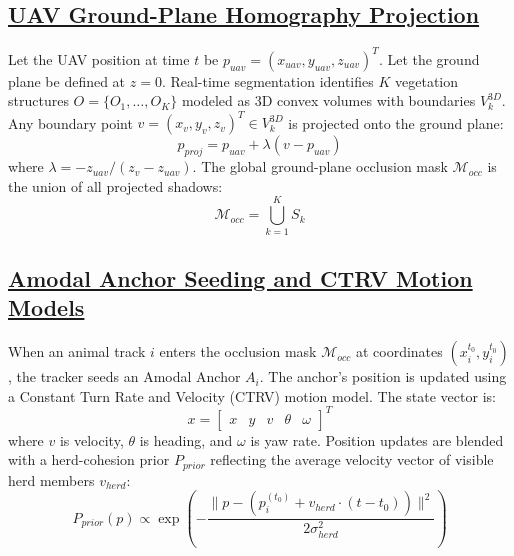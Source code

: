\documentclass[12pt]{article}
\begin{document}
\subsection*{\underline{\textbf{UAV Ground-Plane Homography Projection}}}
Let the UAV position at time $t$ be $p_{uav} = (x_{uav}, y_{uav}, z_{uav})^T$. Let the ground plane be defined at $z=0$. Real-time segmentation identifies $K$ vegetation structures $O = \{O_1, \dots, O_K\}$ modeled as 3D convex volumes with boundaries $V_k^{3D}$. Any boundary point $v = (x_v, y_v, z_v)^T \in V_k^{3D}$ is projected onto the ground plane:
\begin{equation}
p_{proj} = p_{uav} + \lambda (v - p_{uav})
\end{equation}
where $\lambda = -z_{uav} / (z_v - z_{uav})$. The global ground-plane occlusion mask $\mathcal{M}_{occ}$ is the union of all projected shadows:
\begin{equation}
\mathcal{M}_{occ} = \bigcup_{k=1}^K S_k
\end{equation}

\subsection*{\underline{\textbf{Amodal Anchor Seeding and CTRV Motion Models}}}
When an animal track $i$ enters the occlusion mask $\mathcal{M}_{occ}$ at coordinates $(x_i^{t_0}, y_i^{t_0})$, the tracker seeds an Amodal Anchor $A_i$. The anchor's position is updated using a Constant Turn Rate and Velocity (CTRV) motion model. The state vector is:
\begin{equation}
x = \begin{bmatrix} x & y & v & \theta & \omega \end{bmatrix}^T
\end{equation}
where $v$ is velocity, $\theta$ is heading, and $\omega$ is yaw rate. Position updates are blended with a herd-cohesion prior $P_{prior}$ reflecting the average velocity vector of visible herd members $v_{herd}$:
\begin{equation}
P_{prior}(p) \propto \exp\left( -\frac{\|p - (p_i^{(t_0)} + v_{herd}\cdot(t-t_0))\|^2}{2\sigma_{herd}^2} \right)
\end{equation}
\end{document}
